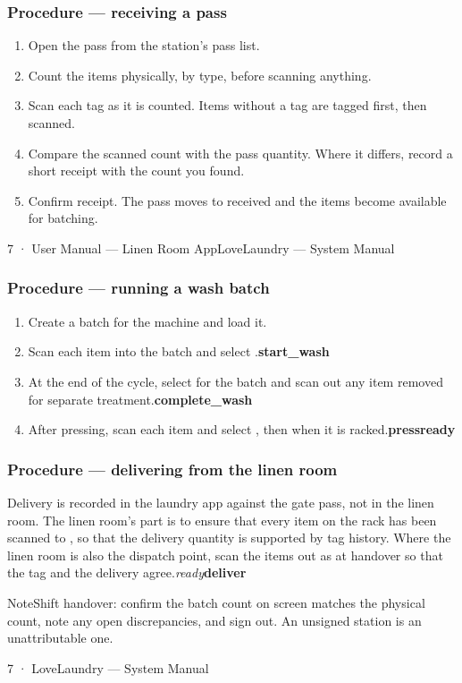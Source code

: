 \documentclass[11pt,a4paper,oneside]{book}
\begin{document}
\subsubsection*{Procedure — receiving a pass}
\begin{enumerate}
\item Open the pass from the station's pass list.
\item Count the items physically, by type, before scanning anything.
\item Scan each tag as it is counted. Items without a tag are tagged first, then scanned.
\item Compare the scanned count with the pass quantity. Where it differs, record a short receipt with the count you found.
\item Confirm receipt. The pass moves to received and the items become available for batching.
\end{enumerate}
7 · User Manual — Linen Room AppLoveLaundry — System Manual

\subsubsection*{Procedure — running a wash batch}
\begin{enumerate}
\item Create a batch for the machine and load it.
\item Scan each item into the batch and select .\textbf{start\_wash}
\item At the end of the cycle, select  for the batch and scan out any item removed for separate treatment.\textbf{complete\_wash}
\item After pressing, scan each item and select , then  when it is racked.\textbf{press}\textbf{ready}
\end{enumerate}
\subsubsection*{Procedure — delivering from the linen room}
Delivery is recorded in the laundry app against the gate pass, not in the linen room. The linen room's part is to ensure that every item on the rack has been scanned to , so that the delivery quantity is supported by tag history. Where the linen room is also the dispatch point, scan the items out as  at handover so that the tag and the delivery agree.\emph{ready}\textbf{deliver}

\begin{notebox}NoteShift handover: confirm the batch count on screen matches the physical count, note any open discrepancies, and sign out. An unsigned station is an unattributable one.\end{notebox}
7 · LoveLaundry — System Manual
\end{document}
